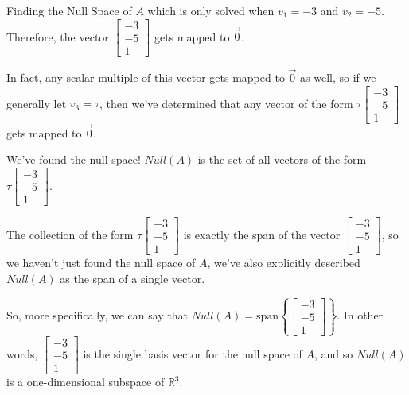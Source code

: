 \documentclass{ximera}
\begin{document}
\begin{exploration}{Finding the Null Space of $A$}
which is only solved when $v_1=-3$ and $v_2=-5$. Therefore, the vector $\begin{bmatrix} -3 \\ -5 \\ 1 \end{bmatrix}$ gets mapped to $\vec{0}$.

In fact, any scalar multiple of this vector gets mapped to $\vec{0}$ as well, so if we generally let $v_3=\tau$, then we've determined that any vector of the form $\tau \begin{bmatrix} -3 \\ -5 \\ 1 \end{bmatrix}$ gets mapped to $\vec{0}$. 

We've found the null space! $Null(A)$ is the set of all vectors of the form $\tau \begin{bmatrix} -3 \\ -5 \\ 1 \end{bmatrix}$.

\end{exploration}

\begin{remark}

    The collection of the form $\tau \begin{bmatrix} -3 \\ -5 \\ 1 \end{bmatrix}$ is exactly the span of the vector $\begin{bmatrix} -3 \\ -5 \\ 1 \end{bmatrix}$, so we haven't just found the null space of $A$, we've also explicitly described $Null(A)$ as the span of a single vector.

    So, more specifically, we can say that $Null(A)=\text{span}\left\{ \begin{bmatrix} -3 \\ -5 \\ 1 \end{bmatrix} \right\}$. In other words, $\begin{bmatrix} -3 \\ -5 \\ 1 \end{bmatrix}$ is the single basis vector for the null space of $A$, and so $Null(A)$ is a one-dimensional subspace of $\mathbb{R}^3$.

\end{remark}
\end{document}
